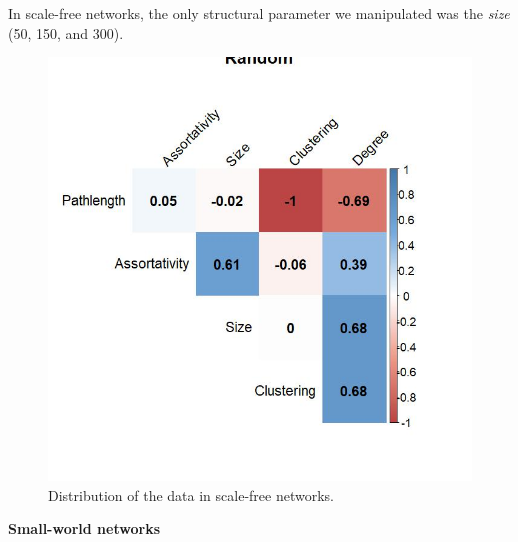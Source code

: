 \documentclass[
]{article}
\begin{document}
In scale-free networks, the only structural parameter we manipulated was
the \emph{size} (50, 150, and 300).

\begin{figure}[!H]

{\centering \includegraphics{./Figures/unnamed-chunk-75-1} 

}

\caption{Distribution of the data in scale-free networks.}\label{fig:unnamed-chunk-75}
\end{figure}

\textbf{Small-world networks}
\end{document}

